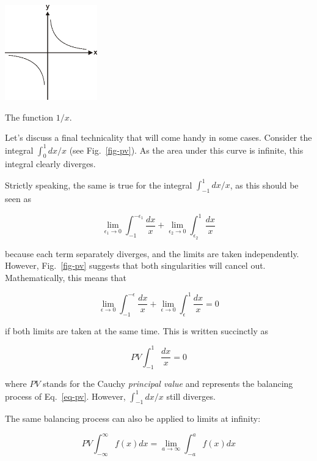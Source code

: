\begin{marginfigure}
\centering
\includegraphics[width=4cm]{complex/figures/pv}
\caption{The function $1/x$.}
\label{fig-pv}
\end{marginfigure}

Let's discuss a final technicality that will come handy in some cases. Consider the integral $\int_0^1 dx / x$ (see Fig.~\ref{fig-pv}). As the area under this curve is infinite, this integral clearly diverges.

Strictly speaking, the same is true for the integral $\int_{-1}^1 dx / x$, as this should be seen as

\begin{equation}
\lim_{\epsilon_1 \to 0} \int_{-1}^{-\epsilon_1} \frac{dx}{x} + \lim_{\epsilon_2
\to 0} \int_{\epsilon_2}^1 \frac{dx}{x}
\end{equation}  

because each term separately diverges, and the limits are taken independently. However, Fig.~\ref{fig-pv} suggests that both singularities will cancel out. Mathematically, this means that

\begin{equation}
\lim_{\epsilon \to 0} \int_{-1}^{-\epsilon} \frac{dx}{x} + \lim_{\epsilon \to 0}
\int_{\epsilon}^1 \frac{dx}{x} = 0 \label{eq-pv}
\end{equation}  

if both limits are taken at the same time. This is written succinctly as

\begin{equation}
PV \int_{-1}^1 \frac{dx}{x} = 0
\end{equation} 

where $PV$ stands for the Cauchy \emph{principal value} and represents the balancing process of Eq.~\ref{eq-pv}. However, $\int_{-1}^1 dx / x$ still diverges.

The same balancing process can also be applied to limits at infinity:

\begin{equation}
PV \int_{-\infty}^\infty f(x) dx = \lim_{a \to \infty} \int_{-a}^{a} f(x) dx
\end{equation} 


